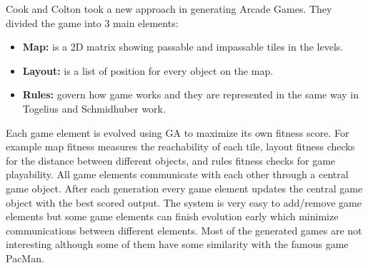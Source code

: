Cook and Colton\cite{cookArcadeGames} took a new approach in generating Arcade Games. They divided the game into 3 main elements:
\begin{itemize} \itemsep0pt \parskip0pt 
	\item \textbf{Map:} is a 2D matrix showing passable and impassable tiles in the levels.
	\item \textbf{Layout:} is a list of position for every object on the map.
	\item \textbf{Rules:} govern how game works and they are represented in the same way in Togelius and Schmidhuber work\cite{arcadeHillClimber}.
\end{itemize}
Each game element is evolved using GA to maximize its own fitness score. For example map fitness measures the reachability of each tile, layout fitness checks for the distance between different objects, and rules fitness checks for game playability. All game elements communicate with each other through a central game object. After each generation every game element updates the central game object with the best scored output. The system is very easy to add/remove game elements but some game elements can finish evolution early which minimize communications between different elements. Most of the generated games are not interesting although some of them have some similarity with the famous game PacMan.\\\par



